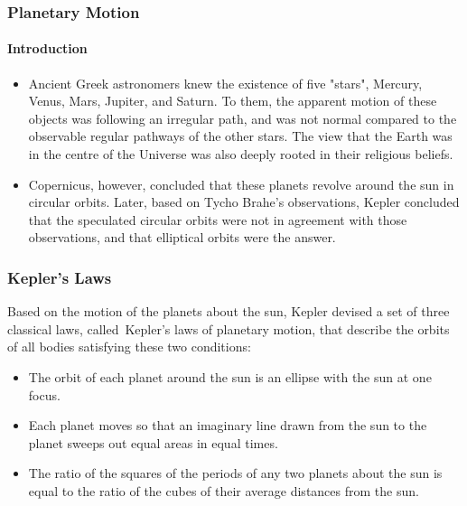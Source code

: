 \documentclass[10pt]{beamer}
\begin{document}
\begin{frame}
    \frametitle{Planetary Motion}
    \framesubtitle{Introduction}
    \begin{itemize}
        \item Ancient Greek astronomers knew the existence of five "stars", Mercury, Venus, Mars, Jupiter, and Saturn. To them, the apparent motion of these objects was following an irregular path, and was not normal compared to the observable regular pathways of the other stars. The view that the Earth was in the centre of the Universe was also deeply rooted in their religious beliefs.
        \item Copernicus, however, concluded that these planets revolve around the sun in circular orbits. Later, based on Tycho Brahe's observations, Kepler concluded that the speculated circular orbits were not in agreement with those observations, and that elliptical orbits were the answer.
    \end{itemize}
\end{frame}

\begin{frame}
    \frametitle{Kepler's Laws}
    Based on the motion of the planets about the sun, Kepler devised a set of three classical laws, called Kepler’s laws of planetary motion, that describe the orbits of all bodies satisfying these two conditions:
    \begin{itemize}
        \item The orbit of each planet around the sun is an ellipse with the sun at one focus.
        \item Each planet moves so that an imaginary line drawn from the sun to the planet sweeps out equal areas in equal times.
        \item The ratio of the squares of the periods of any two planets about the sun is equal to the ratio of the cubes of their average distances from the sun.
    \end{itemize}
\end{frame}
\end{document}
